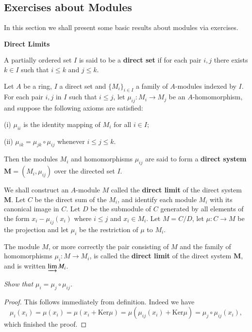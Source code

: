 \subsection{Exercises about Modules}
In this section we shall present some basic results about modules via exercises.
\begin{center}
\begin{large}
    \textbf{Direct Limits}
\end{large}
\end{center}
A partially ordered set $I$ is said to be a \textbf{direct set} if for each pair $i,j$ there exists $k\in I$ such that $i\le k$ and $j\le k$.\par
Let $A$ be a ring, $I$ a direct set and $\{M_i\}_{i\in I}$ a family of $A$-modules indexed by $I$. For each pair $i,j$ in $I$ such that $i\le j$, let $\mu_{ij}:M_i\to M_j$ be an $A$-homomorphism, and suppose the following axioms are satisfied: \par
(i) $\mu_{ii}$ is the identity mapping of $M_i$ for all $i\in I$;\par
(ii) $\mu_{ik}=\mu_{jk}\circ\mu_{ij}$ whenever $i\le j\le k$.\par
Then the modules $M_i$ and homomorphisms $\mu_{ij}$ are said to form a \textbf{direct system} $\mathbf{M}=(M_i,\mu_{ij})$ over the directed set $I$.\par
We shall construct an $A$-module $M$ called the \textbf{direct limit} of the direct system $\mathbf{M}$. Let $C$ be the direct sum of the $M_i$, and identify each module $M_i$ with its canonical image in $C$. Let $D$ be the submodule of $C$ generated by all elements of the form $x_i-\mu_{ij}(x_i)$ where $i\le j$ and $x_i\in M_i$. Let $M=C/D$, let $\mu:C\to M$ be the projection and let $\mu_i$ be the restriction of $\mu$ to $M_i$.\par
The module $M$, or more correctly the pair consisting of $M$ and the family of homomorphisms $\mu_i:M\to M_i$, is called the \textbf{direct limit} of the direct system $\mathbf{M}$, and is written $\varinjlim M_i$.
\begin{problem}\em
Show that $\mu_i=\mu_j\circ\mu_{ij}$.
\end{problem}
\begin{proof}
This follows immediately from definition. Indeed we have 
$$
\mu _i\left( x_i \right) =\mu \left( x_i \right) =\mu \left( x_i+\mathrm{Ker}\mu \right) =\mu \left( \mu _{ij}\left( x_i \right) +\mathrm{Ker}\mu \right) =\mu _j\circ \mu _{ij}\left( x_i \right) ,
$$
which finished the proof.
\end{proof}
